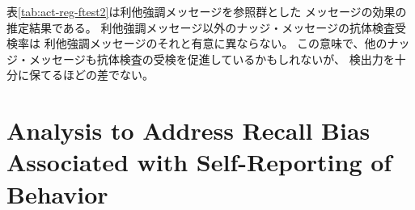 \documentclass[
  11pt,
  a4paper,
]{article}
\begin{document}
表\ref{tab:act-reg-ftest2}は利他強調メッセージを参照群とした
メッセージの効果の推定結果である。
利他強調メッセージ以外のナッジ・メッセージの抗体検査受検率は
利他強調メッセージのそれと有意に異ならない。
この意味で、他のナッジ・メッセージも抗体検査の受検を促進しているかもしれないが、
検出力を十分に保てるほどの差でない。

\clearpage

\hypertarget{analysis-to-address-recall-bias-associated-with-self-reporting-of-behavior}{%
\section{Analysis to Address Recall Bias Associated with Self-Reporting of Behavior}\label{analysis-to-address-recall-bias-associated-with-self-reporting-of-behavior}}
\end{document}
